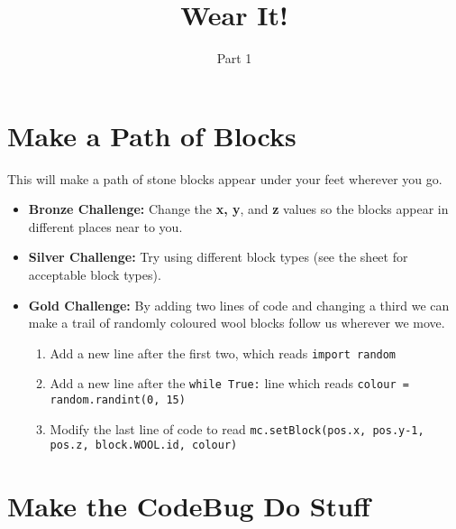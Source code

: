 \documentclass{geocraft-worksheet}
\begin{document}
\title{Wear It!}
\subtitle{Part 1}

\date{}

\maketitle


\section{Make a Path of Blocks}
\lstset{language=Python}

\noindent%
%
\vspace{0.2cm}
%
%

\noindent This will make a path of stone blocks appear under your feet wherever you go.\vspace{-0.3cm}
\begin{itemize}
\item\textbf{Bronze Challenge:} Change the \textbf{x, y}, and \textbf {z} values so the blocks appear in different
  places near to you.   
\item\textbf{Silver Challenge:} Try using different block types (see the sheet for acceptable block types).
\item\textbf{Gold Challenge:} By adding two lines of code and changing a third we can make a trail of randomly coloured
  wool blocks follow us wherever we move. 
\begin{enumerate}
\item Add a new line after the first two, which reads \lstinline{import random}
\item Add a new line after the \lstinline{while True:} line which reads \lstinline{colour = random.randint(0, 15)} 
\item Modify the last line of code to read \lstinline{mc.setBlock(pos.x, pos.y-1, pos.z, block.WOOL.id, colour)} 
\end{enumerate}
\end{itemize}

\section{Make the CodeBug Do Stuff}

\noindent%
%
\vspace{0.2cm}
%
%
\end{document}
